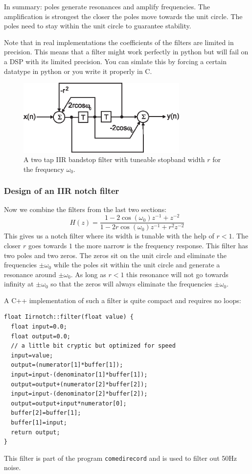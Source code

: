 \documentclass[12pt,a4paper]{article}
\begin{document}
In summary: poles generate resonances and amplify frequencies. The
amplification is strongest the closer the poles move towards the unit
circle. The poles need to stay within the unit circle to guarantee
stability. 

Note that in real implementations the coefficients of the
filters are limited in precision. This means that a filter might
work perfectly in python but will fail on a DSP with its limited
precision. You can simlate this by forcing a certain datatype
in python or you write it properly in C.

\begin{figure}[!hbt]
\begin{center}
\mbox{\includegraphics[width=0.75\textwidth]{iir_fir_stop}}
\end{center}
\caption{A two tap IIR bandstop filter with tuneable stopband width $r$
for the frequency $\omega_0$.
\label{iir_fir_stop}}
\end{figure}

\subsubsection{Design of an IIR notch filter}
Now we combine the filters from the last two sections:
\begin{equation} 
H(z) = \frac {1 - 2 \cos (\omega_{0}) z^{-1} + z^{-2}}{1 - 2r \cos (\omega_{0}) z^{-1} + r^{2} z^{-2}} 
\end{equation}
This gives us a notch filter where its width is tunable with the
help of $r<1$. The closer $r$ goes towards $1$ the more narrow
is the frequency response.
This filter has two poles and two zeros. The zeros sit on the unit
circle and eliminate the frequencies $\pm\omega_0$ while the
poles sit within the unit circle and generate a resonance around
$\pm\omega_0$. As long as $r<1$ this resonance will not go towards
infinity at $\pm\omega_0$ so that the zeros will always eliminate
the frequencies $\pm\omega_0$.

A C++ implementation of such a filter is quite compact and
requires no loops:
\begin{verbatim}
float Iirnotch::filter(float value) {
  float input=0.0;
  float output=0.0;
  // a little bit cryptic but optimized for speed
  input=value;
  output=(numerator[1]*buffer[1]);
  input=input-(denominator[1]*buffer[1]);
  output=output+(numerator[2]*buffer[2]);
  input=input-(denominator[2]*buffer[2]);
  output=output+input*numerator[0];
  buffer[2]=buffer[1];
  buffer[1]=input;
  return output;
}
\end{verbatim}
This filter is part of the program \texttt{comedirecord}
and is used to filter out 50Hz noise.
\end{document}
